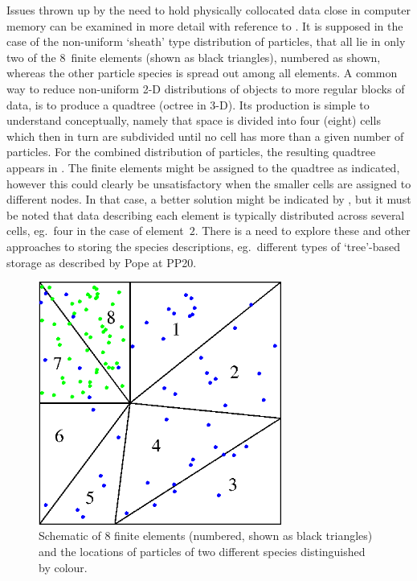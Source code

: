 Issues thrown up by the need to hold physically collocated data close in computer memory
can be examined in more detail with reference to . It is supposed
in the case of the non-uniform `sheath' type distribution of particles, that all lie in
only two of the $8$~finite elements (shown as black triangles), numbered as shown,
whereas the other particle species is spread out among all elements.
A common way to reduce non-uniform 2-D distributions of objects to more regular
blocks of data, is to produce a quadtree (octree in 3-D). Its production
is simple to understand conceptually, namely that space is divided into four (eight)
cells which then in turn are subdivided until no cell has more than a given number of
particles. For the combined distribution of particles, the resulting quadtree appears in
. The finite elements might be assigned to the quadtree as indicated,
however this could clearly be unsatisfactory when the smaller cells are
assigned to different nodes. In that case, a better solution might be indicated by ,
but it must be noted that data describing each element is typically distributed across
several cells, eg.\ four in the case of element~$2$. There is a need to explore these
and other approaches to storing the species descriptions, eg.\ different types of
`tree'-based storage as described by Pope at PP20.
\begin{figure}
\centerline{\includegraphics[width=8cm]{../pics/sweltsqnum.png}}
\caption{Schematic of $8$ finite elements (numbered, shown as black triangles)
and the locations of particles of two different species distinguished by 
colour.
\label{fig:sweltsqnum}}
\end{figure}
